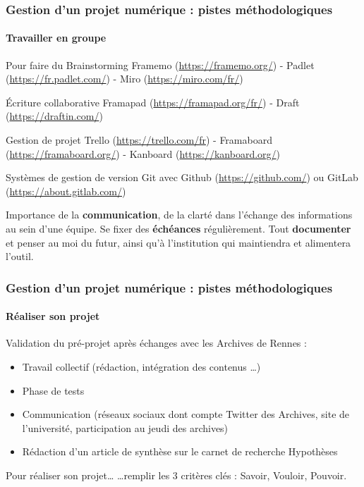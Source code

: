 \documentclass[xcolor=table]{beamer}
\begin{document}
\begin{frame}[allowframebreaks]
\frametitle{Gestion d'un projet num\'erique : pistes m\'ethodologiques}
\framesubtitle{Travailler en groupe}
\begin{beamerboxesrounded}{Pour faire du Brainstorming}
Framemo (\url{https://framemo.org/}) - Padlet (\url{https://fr.padlet.com/}) - Miro (\url{https://miro.com/fr/})
\end{beamerboxesrounded}
\begin{beamerboxesrounded}[upper=titre,lower=texte,shadow=true]{\'Ecriture collaborative}
Framapad (\url{https://framapad.org/fr/}) - Draft (\url{https://draftin.com/})
\end{beamerboxesrounded}
\begin{beamerboxesrounded}{Gestion de projet}
Trello (\url{https://trello.com/fr}) - Framaboard (\url{https://framaboard.org/}) - Kanboard (\url{https://kanboard.org/})
\end{beamerboxesrounded}
\begin{beamerboxesrounded}[upper=titre,lower=texte,shadow=true]{Syst\`emes de gestion de version}
Git avec Github (\url{https://github.com/}) ou GitLab (\url{https://about.gitlab.com/})
\end{beamerboxesrounded}

Importance de la \textbf{communication}, de la clart\'e dans l'\'echange des informations au sein d'une \'equipe. Se fixer des \textbf{\'ech\'eances} r\'eguli\`erement. Tout \textbf{documenter} et penser au \og moi du futur\fg{}, ainsi qu'\`a l'institution qui maintiendra et alimentera l'outil.
\end{frame}

\begin{frame}[plain]
\frametitle{Gestion d'un projet num\'erique : pistes m\'ethodologiques}
\framesubtitle{R\'ealiser son projet}
Validation du pr\'e-projet apr\`es \'echanges avec les Archives de Rennes :
\begin{itemize}
    \item Travail collectif (r\'edaction, int\'egration des contenus \ldots)
    \item Phase de tests
    \item Communication (r\'eseaux sociaux dont compte Twitter des Archives, site de l'universit\'e, participation au \og jeudi des archives\fg{})
    \item R\'edaction d'un article de synth\`ese sur le carnet de recherche Hypoth\`eses
\end{itemize}
\begin{beamerboxesrounded}{Pour r\'ealiser son projet\ldots}
\ldots remplir les 3 crit\`eres cl\'es : Savoir, Vouloir, Pouvoir.
\end{beamerboxesrounded}
\end{frame}
\end{document}
